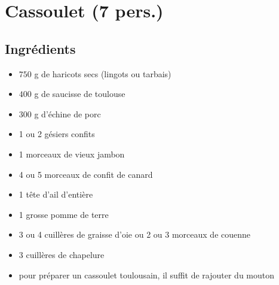 \newpage
\section{Cassoulet (7 pers.)}
\subsection*{Ingrédients}
\begin{itemize}
\item $750$ g de haricots secs (lingots ou tarbais)
\item $400$ g de saucisse de toulouse
\item $300$ g d'échine de porc
\item 1 ou 2 gésiers confits
\item 1 morceaux de vieux jambon
\item 4 ou 5 morceaux de confit de canard
\item 1 tête d'ail d'entière
\item 1 grosse pomme de terre
\item 3 ou 4 cuillères de graisse d'oie ou 2 ou 3 morceaux de couenne
\item 3 cuillères de chapelure
\item pour préparer un cassoulet toulousain, il suffit de rajouter du mouton
\end{itemize}

